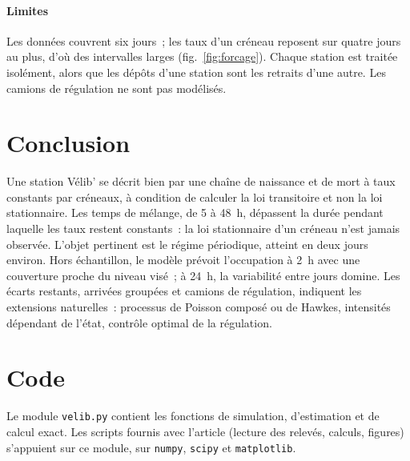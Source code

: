 \documentclass[10pt,a4paper,twocolumn]{article}
\theoremstyle{enonce}
\theoremstyle{defi}
\begin{document}
\paragraph{Limites} Les données couvrent six jours~; les taux d'un créneau reposent sur quatre jours au plus, d'où des intervalles larges (fig.~\ref{fig:forcage}). Chaque station est traitée isolément, alors que les dépôts d'une station sont les retraits d'une autre. Les camions de régulation ne sont pas modélisés.

\section{Conclusion}

Une station Vélib' se décrit bien par une chaîne de naissance et de mort à taux constants par créneaux, à condition de calculer la loi transitoire et non la loi stationnaire. Les temps de mélange, de 5 à 48~h, dépassent la durée pendant laquelle les taux restent constants~: la loi stationnaire d'un créneau n'est jamais observée. L'objet pertinent est le régime périodique, atteint en deux jours environ. Hors échantillon, le modèle prévoit l'occupation à 2~h avec une couverture proche du niveau visé~; à 24~h, la variabilité entre jours domine. Les écarts restants, arrivées groupées et camions de régulation, indiquent les extensions naturelles~: processus de Poisson composé ou de Hawkes, intensités dépendant de l'état, contrôle optimal de la régulation.

\appendix
\section{Code}\label{sec:code}

Le module \texttt{velib.py} contient les fonctions de simulation, d'estimation et de calcul exact. Les scripts fournis avec l'article (lecture des relevés, calculs, figures) s'appuient sur ce module, sur \texttt{numpy}, \texttt{scipy} et \texttt{matplotlib}.
\end{document}
